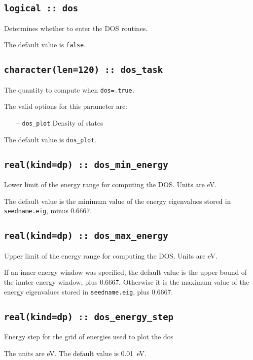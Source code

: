 \subsection[dos]{\tt logical :: dos}
Determines whether to enter the DOS routines.

The default value is \verb#false#.


\subsection[berry\_task]{\tt character(len=120) ::  dos\_task}
The quantity to compute when {\tt dos=.true.}

The valid options for this parameter are:
\begin{itemize}
\item[{\bf --}]  \verb#dos_plot# Density of states
\end{itemize}


The default value is \verb#dos_plot#.


\subsection[dos\_win\_min]{\tt real(kind=dp) :: dos\_min\_energy}
Lower limit of the energy range for computing the DOS.
Units are eV.

The default value is the minimum value of the energy eigenvalues
stored in {\tt seedname.eig}, minus 0.6667.

\subsection[dos\_win\_max]{\tt real(kind=dp) :: dos\_max\_energy}
Upper limit of the energy range for computing the DOS.
Units are eV.

If an inner energy window was specified, 
the default value is the upper bound of the innter energy window, plus 0.6667.
Otherwise it is  the maximum value of the energy eigenvalues
stored in {\tt seedname.eig}, plus 0.6667.

\subsection[berry\_energy\_step]{\tt real(kind=dp) :: dos\_energy\_step}
Energy step for the grid of energies used to plot the dos

The units are eV.
The default value is 0.01~eV.

